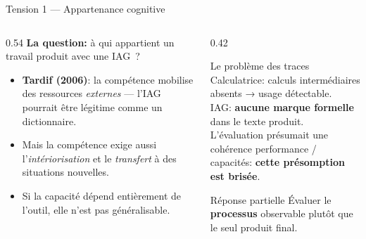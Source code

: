 \begin{frame}{Tension 1 --- Appartenance cognitive}
  \begin{columns}[T]
    \begin{column}{0.54\textwidth}
      \textbf{La question:} à qui appartient un travail
      produit avec une IAG~?\\[0.6em]
      \begin{itemize}
        \item \textbf{Tardif (2006)}: la compétence mobilise
              des ressources \emph{externes} --- l'IAG
              pourrait être légitime comme un dictionnaire.
        \item Mais la compétence exige aussi
              l'\emph{intériorisation} et le
              \emph{transfert} à des situations nouvelles.
        \item Si la capacité dépend entièrement de
              l'outil, elle n'est pas généralisable.
      \end{itemize}
    \end{column}
    \begin{column}{0.42\textwidth}
      \begin{alertblock}{Le problème des traces}
        Calculatrice: calculs intermédiaires
        absents → usage détectable.\\[0.3em]
        IAG: \textbf{aucune marque formelle}
        dans le texte produit.\\[0.3em]
        L'évaluation présumait une cohérence
        performance / capacités: \textbf{cette
        présomption est brisée}.
      \end{alertblock}
      \vspace{-0.5em}
      \begin{block}{Réponse partielle}
        Évaluer le \textbf{processus} observable
        plutôt que le seul produit final.
      \end{block}
    \end{column}
  \end{columns}
\end{frame}

